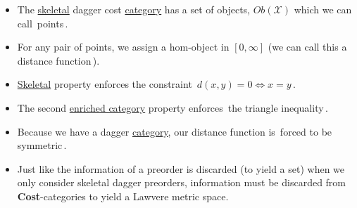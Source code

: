 \begin{itemize}
    \item The \href{doc/1 math/Seven Sketches in Compositionality/Chapter 1: Generative Effects/3 Preorders/Skeletality}{skeletal} dagger cost \href{doc/1 math/Seven Sketches in Compositionality/Chapter 2: Resource theories/3 Enrichment/1 V-categories/1 V-category}{category} has a set of objects, $Ob(\mathcal{X})$ which we can call \,points\,.
    \item For any pair of points, we assign a hom-object in $[0,\infty]$ (we can call this a \,distance function\,).
    \item \href{doc/1 math/Seven Sketches in Compositionality/Chapter 1: Generative Effects/3 Preorders/Skeletality}{Skeletal} property enforces the constraint \,$d(x,y)=0 \iff x=y$\,.
    \item The second \href{doc/1 math/Seven Sketches in Compositionality/Chapter 2: Resource theories/3 Enrichment/1 V-categories/1 V-category}{enriched category} property enforces \,the triangle inequality\,.
    \item Because we have a dagger \href{doc/1 math/Seven Sketches in Compositionality/Chapter 2: Resource theories/3 Enrichment/1 V-categories/1 V-category}{category}, our distance function is \,forced to be symmetric\,.
    \item Just like the information of a preorder is discarded (to yield a set) when we only consider skeletal dagger preorders, information must be discarded from \textbf{Cost}-categories to yield a Lawvere metric space.

  \end{itemize}
